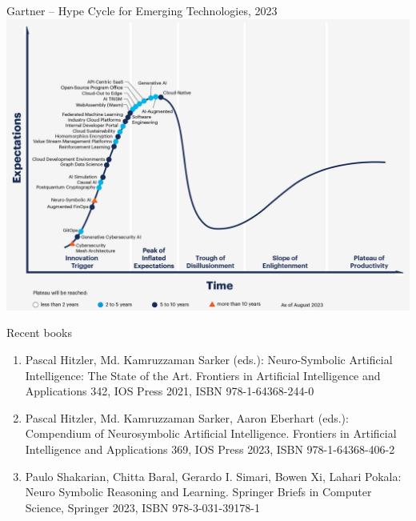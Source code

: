 \documentclass{lecture}
\begin{document}
\begin{frame}{Gartner -- Hype Cycle for Emerging Technologies, 2023}
    \centering\includegraphics[width=.9\textwidth]{2023-gartner-hype-cycle-for-emerging-technologies.png}    
\end{frame}

\begin{frame}{Recent books}
    \begin{enumerate}
        \item Pascal Hitzler, Md. Kamruzzaman Sarker (eds.):
        \alert{Neuro-Symbolic} Artificial Intelligence: The State of the Art. Frontiers in Artificial Intelligence and Applications 342, IOS Press \alert{2021}, ISBN 978-1-64368-244-0
        \item Pascal Hitzler, Md. Kamruzzaman Sarker, Aaron Eberhart (eds.):
        Compendium of \alert{Neurosymbolic} Artificial Intelligence. Frontiers in Artificial Intelligence and Applications 369, IOS Press \alert{2023}, ISBN 978-1-64368-406-2
        \item Paulo Shakarian, Chitta Baral, Gerardo I. Simari, Bowen Xi, Lahari Pokala:
        \alert{Neuro Symbolic} Reasoning and Learning. Springer Briefs in Computer Science, Springer \alert{2023}, ISBN 978-3-031-39178-1
    \end{enumerate}
\end{frame}
\end{document}
